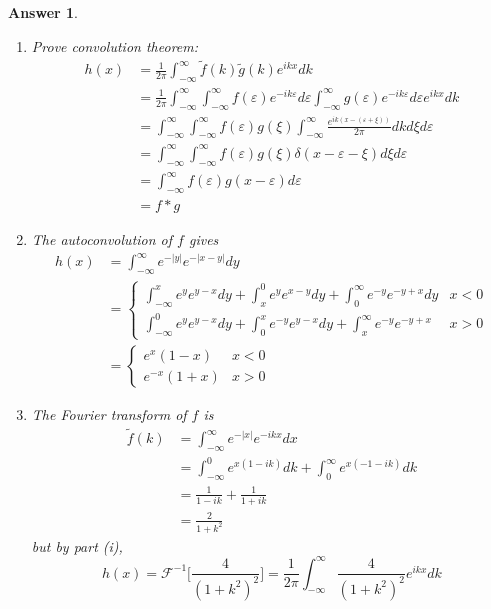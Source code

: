 \documentclass[a4paper]{article}
\newtheorem{ans}{Answer}[section]
\theoremstyle{new}
\begin{document}
\begin{ans}\leavevmode
\begin{enumerate}[label=(\roman*)]
\item Prove convolution theorem:
\begin{align}
    h(x)&=\frac{1}{2\pi}\int_{-\infty}^\infty\tilde{f}(k)\tilde{g}(k)e^{ikx}dk\nonumber\\&=\frac{1}{2\pi}\int_{-\infty}^\infty\int_{-\infty}^\infty f(\varepsilon)e^{-ik\varepsilon}d\varepsilon\int_{-\infty}^\infty g(\varepsilon)e^{-ik\varepsilon}d\varepsilon e^{ikx}dk\nonumber\\&=\int_{-\infty}^\infty\int_{-\infty}^\infty f(\varepsilon)g(\xi)\int_{-\infty}^\infty\frac{e^{ik(x-(\varepsilon+\xi))}}{2\pi}dkd\xi d\varepsilon\nonumber\\&=\int_{-\infty}^\infty \int_{-\infty}^\infty f(\varepsilon)g(\xi)\delta(x-\varepsilon-\xi)d\xi d\varepsilon\nonumber\\&=\int_{-\infty}^\infty f(\varepsilon)g(x-\varepsilon)d\varepsilon\nonumber\\&=f*g\nonumber
\end{align}
\item The autoconvolution of $f$ gives
\begin{align}
    h(x)&=\int_{-\infty}^\infty e^{-|y|}e^{-|x-y|}dy\nonumber\\&=\left\{
        \begin{array}{ll}
      \int_{-\infty}^x e^ye^{y-x}dy+\int_x^0e^ye^{x-y}dy+\int_0^\infty e^{-y}e^{-y+x}dy& x<0 \\
      \int_{-\infty}^0e^ye^{y-x}dy+\int_0^x e^{-y}e^{y-x}dy+\int_x^\infty e^{-y}e^{-y+x}& x>0
        \end{array}
    \right.\nonumber\\&=\left\{
        \begin{array}{ll}
      e^x(1-x)& x<0 \\
      e^{-x}(1+x)& x>0
        \end{array}
    \right.\nonumber
\end{align}
\item The Fourier transform of $f$ is
\begin{align}
    \tilde{f}(k)&=\int_{-\infty}^\infty e^{-|x|}e^{-ikx}dx\nonumber\\&=\int_{-\infty}^0e^{x(1-ik)}dk+\int_0^\infty e^{x(-1-ik)}dk\nonumber\\&=\frac{1}{1-ik}+\frac{1}{1+ik}\nonumber\\&=\frac{2}{1+k^2}\nonumber
\end{align}
but by part (i),
$$h(x)=\mathcal{F}^{-1}\bigg[\frac{4}{(1+k^2)^2}\bigg]=\frac{1}{2\pi}\int_{-\infty}^\infty\frac{4}{(1+k^2)^2}e^{ikx}dk$$


\end{enumerate}
\end{ans}
\end{document}
